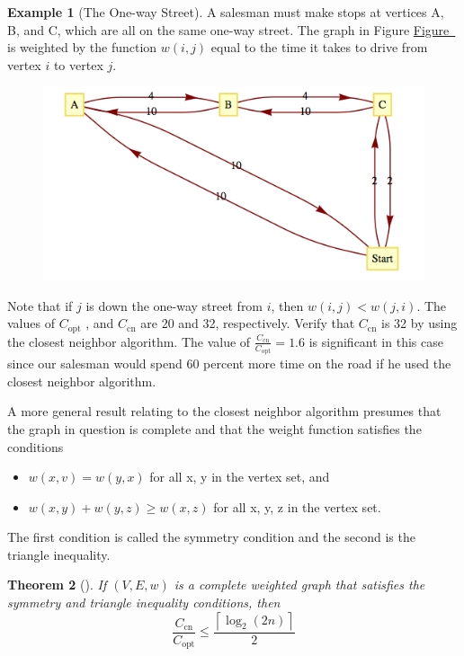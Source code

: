 \documentclass[10pt,]{book}
\theoremstyle{plain}
\newtheorem{theorem}{Theorem}[section]
\theoremstyle{definition}
\theoremstyle{definition}
\theoremstyle{definition}
\newtheorem{example}[theorem]{Example}
\theoremstyle{definition}
\theoremstyle{definition}
\numberwithin{equation}{section}
\begin{document}
\begin{example}[The One-way Street]\label{ex-one-way-street}
 A salesman must make stops at vertices A, B, and C, which are all on the same one-way street. The graph in Figure \hyperref[fig-directed-tsp-example]{Figure~} is weighted by the function \(w(i, j)\) equal to the time it takes to drive from vertex \(i\) to vertex \(j\).%
\leavevmode%
\begin{figure}
\centering
\includegraphics[width=1\linewidth]{images/fig-directed-tsp-example.png}
\end{figure}
\par
Note that if \(j\) is down the one-way street from \(i\), then \(w(i, j) < w(j, i)\). The values of \(C_{\text{opt}}\) , and \(C_{\text{cn}}\)
are 20 and 32, respectively. Verify that \(C_{\text{cn}}\) is 32 by using the closest neighbor algorithm. The value of \(\frac{C_{\text{cn}}}{C_{\text{opt}}} = 1.6\) is significant in this case since our salesman would spend 60 percent more time on the road if he used the closest neighbor algorithm.%
\end{example}
\par
A more general result relating to the closest neighbor algorithm presumes that the graph in question is complete and that the weight function satisfies the conditions%
\par
\leavevmode%
\begin{itemize}[label=\textbullet]
\item{} \(w(x, v) = w(y, x)\) for all  x, y in the vertex set, and %
\item{} \(w(x, y) + w(y, z) \geq  w(x, z)\) for all  x, y, z in the vertex set.%
\end{itemize}
%
\par
The first condition is called the  symmetry condition and the second is the  triangle inequality.%
\begin{theorem}[]\label{th-cn-theorem-9-5}
\index{}If \((V, E, w)\) is a complete weighted graph that satisfies the symmetry and triangle inequality conditions, then
\[\frac{C_{\text{cn}}}{C_{\text{opt}}}\leq \frac{\left\lceil \log _2 (2n)\right\rceil }{2}\]%
\end{theorem}
\end{document}
